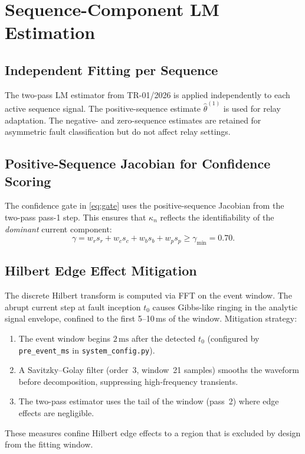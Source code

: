 \documentclass[12pt,a4paper]{article}
\theoremstyle{definition}
\theoremstyle{plain}
\newcommand{\mss}{\,\text{ms}}
\begin{document}
\section{Sequence-Component LM Estimation}
\label{sec:estimation}

\subsection{Independent Fitting per Sequence}
\label{sec:estimation:fitting}

The two-pass LM estimator from TR-01/2026 is applied independently to each
active sequence signal.  The positive-sequence estimate $\hat{\theta}^{(1)}$
is used for relay adaptation.  The negative- and zero-sequence estimates
are retained for asymmetric fault classification but do not affect relay
settings.

\subsection{Positive-Sequence Jacobian for Confidence Scoring}
\label{sec:estimation:jacobian}

The confidence gate in \cref{eq:gate} uses the positive-sequence Jacobian
from the two-pass pass-1 step.  This ensures that $\kappa_n$ reflects the
identifiability of the \emph{dominant} current component:
\begin{equation}
  \gamma = w_r s_r + w_c s_c + w_b s_b + w_p s_p \geq \gamma_{\min} = 0.70.
  \label{eq:gate}
\end{equation}

\subsection{Hilbert Edge Effect Mitigation}
\label{sec:estimation:edge}

The discrete Hilbert transform is computed via FFT on the event window.
The abrupt current step at fault inception $t_0$ causes Gibbs-like ringing
in the analytic signal envelope, confined to the first 5--10\,ms of the
window.  Mitigation strategy:
\begin{enumerate}
  \item The event window begins $2\mss$ after the detected $t_0$
        (configured by \texttt{pre\_event\_ms} in \texttt{system\_config.py}).
  \item A Savitzky--Golay filter (order~3, window~21 samples) smooths the
        waveform before decomposition, suppressing high-frequency transients.
  \item The two-pass estimator uses the tail of the window (pass~2) where
        edge effects are negligible.
\end{enumerate}
These measures confine Hilbert edge effects to a region that is excluded by
design from the fitting window.
\end{document}
